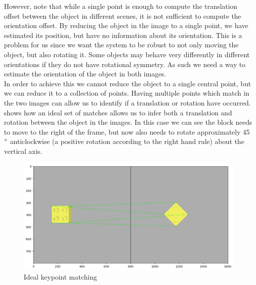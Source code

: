 However, note that while a single point is enough to compute the translation offset between the object in different scenes, it is not sufficient to compute the orientation offset. By reducing the object in the image to a single point, we have estimated its position, but have no information about its orientation. This is a problem for us since we want the system to be robust to not only moving the object, but also rotating it. Some objects may behave very differently in different orientations if they do not have rotational symmetry. As such we need a way to estimate the orientation of the object in both images.\\

In order to achieve this we cannot reduce the object to a single central point, but we can reduce it to a collection of points. Having multiple points which match in the two images can allow us to identify if a translation or rotation have occurred.  shows how an ideal set of matches allows us to infer both a translation and rotation between the object in the images. In this case we can see the block needs to move to the right of the frame, but now also needs to rotate approximately 45$\operatorname{^{\circ}}$ anticlockwise (a positive rotation according to the right hand rule) about the vertical axis.

\begin{figure}[h]
    \centering
    \includegraphics[width=\textwidth]{figures/ideal_matches.png}
    \caption{Ideal keypoint matching}
    \label{fig:ideal-matches}
\end{figure}

